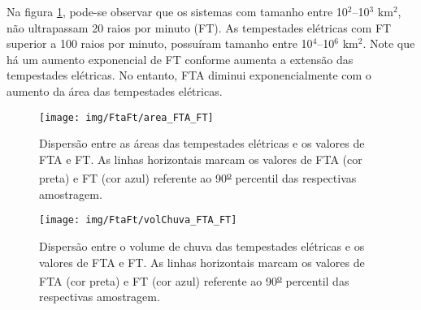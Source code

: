 
Na figura \ref{areaFTAFTA}, pode-se observar que os sistemas com tamanho entre 10$^2$--10$^3$ km$^2$, não ultrapassam 20 raios por minuto (FT). As tempestades elétricas com FT superior a 100 raios por minuto, possuíram tamanho entre 10$^{4}$--10$^{6}$ km$^2$. Note que há um aumento exponencial de FT conforme aumenta a extensão das tempestades elétricas. No entanto, FTA diminui exponencialmente com o aumento da área das tempestades elétricas.


\begin{figure}[!ht]
  \centering
  \texttt{[image: img/FtaFt/area\_FTA\_FT]}   
  \caption{Dispersão entre as áreas das tempestades elétricas e os valores de FTA e FT. As linhas horizontais marcam os valores de FTA (cor preta) e FT (cor azul) referente ao 90\textsuperscript{\underline{o}} percentil das respectivas amostragem.}
  \label{areaFTAFTA}  
\end{figure}

\begin{figure}[!hb]
  \centering 
  \texttt{[image: img/FtaFt/volChuva\_FTA\_FT]}
  \caption{Dispersão entre o volume de chuva das tempestades elétricas e os valores de FTA e FT.  As linhas horizontais marcam os valores de FTA (cor preta) e FT (cor azul) referente ao 90\textsuperscript{\underline{o}} percentil das respectivas amostragem.}
  \label{volchuvaFTAFT}
\end{figure}

